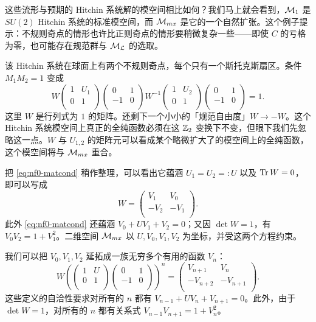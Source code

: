 这些流形与预期的 Hitchin 系统解的模空间相比如何？我们马上就会看到，$\mathcal{M}_1$ 是 $SU(2)$ Hitchin 系统的标准模空间，而 $\mathcal{M}_{mx}$ 是它的一个自然扩张。这个例子提示：不规则奇点的情形也许比正则奇点的情形要稍微复杂一些——即使 $C$ 的亏格为零，也可能存在规范群与 $\mathcal{M}_{\mathcal{L}}$ 的选取。

该 Hitchin 系统在球面上有两个不规则奇点，每个只有一个斯托克斯扇区。条件 $M_1M_2=1$ 变成
\begin{equation} \label{eq:nf0-matcond}
W \begin{pmatrix} 1 & U_1 \\  0  & 1 \\ \end{pmatrix}\begin{pmatrix} 0 & 1 \\  - 1  & 0 \\ \end{pmatrix} W^{-1} \begin{pmatrix} 1 & U_2 \\  0  & 1 \\ \end{pmatrix}\begin{pmatrix} 0 & 1 \\  - 1  & 0 \\ \end{pmatrix}=1.
\end{equation}
这里 $W$ 是行列式为 $1$ 的矩阵。还剩下一个小小的「规范自由度」$W\to -W$。这个 Hitchin 系统模空间上真正的全纯函数必须在这 $\mathbb{Z}_2$ 变换下不变，但眼下我们先忽略这一点。$W$ 与 $U_{1,2}$ 的矩阵元可以看成某个略微扩大了的模空间上的全纯函数，这个模空间将与 $\mathcal{M}_{mx}$ 重合。

把 \eqref{eq:nf0-matcond} 稍作整理，可以看出它蕴涵 $U_1=U_2=:U$ 以及 $\operatorname{Tr} W=0$，即可以写成
\begin{equation}
W = \begin{pmatrix} V_1 & V_0 \\  -V_2  & -V_1 \\ \end{pmatrix}.
\end{equation}
此外 \eqref{eq:nf0-matcond} 还蕴涵 $V_0+UV_1+V_2=0$；又因 $\det W=1$，有 $V_0V_2=1+V_1^2$。二维空间 $\mathcal{M}_{mx}$ 以 $U,V_0,V_1,V_2$ 为坐标，并受这两个方程约束。

我们可以把 $V_0,V_1,V_2$ 延拓成一族无穷多个有用的函数 $V_n$：
\begin{equation}
W \left(\begin{pmatrix} 1 & U \\  0  & 1 \\ \end{pmatrix}\begin{pmatrix} 0 & 1 \\  - 1  & 0 \\ \end{pmatrix} \right)^n=\begin{pmatrix} V_{n+1} & V_n \\  -V_{n+2}  & -V_{n+1} \\ \end{pmatrix}.
\end{equation}
这些定义的自洽性要求对所有的 $n$ 都有 $V_{n-1}+UV_n+V_{n+1}=0$。此外，由于 $\det W=1$，对所有的 $n$ 都有关系式 $V_{n-1}V_{n+1}=1+V_n^2$。

